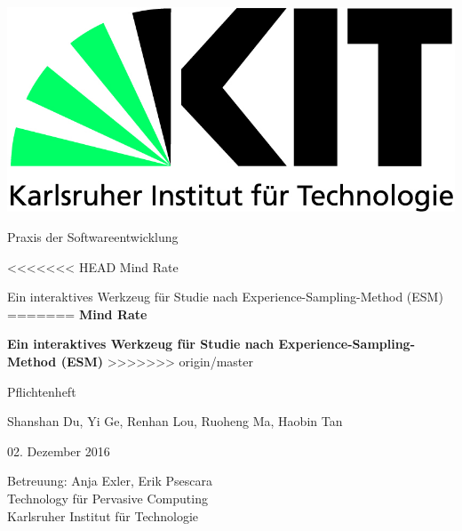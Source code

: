 \documentclass[a4paper]{scrreprt}
\begin{document}
 
    \begin{flushright}
        \includegraphics[scale = 0.7]{kit-logo.jpg}\\[0.5cm]
    \end{flushright}
    \vspace*{2cm} 

    \begin{center} \large 
    
        Praxis der Softwareentwicklung
        \vspace * {1.5cm}

<<<<<<< HEAD
        {\textbf \huge Mind Rate}
		
        \vspace*{1cm}
		
        {\textbf \large Ein interaktives Werkzeug f\"ur Studie nach Experience-Sampling-Method (ESM)}
=======
        \textbf{\huge Mind Rate}
		
        \vspace*{1cm}
		
        \textbf{\large Ein interaktives Werkzeug f\"ur Studie nach Experience-Sampling-Method (ESM)}
>>>>>>> origin/master
        \vspace*{1cm}

        {\large Pflichtenheft}
        \vspace*{2cm}

        Shanshan Du, Yi Ge, Renhan Lou, Ruoheng Ma, Haobin Tan
        \vspace*{1cm}

        02. Dezember 2016
        \vspace*{2.5cm}


        Betreuung: Anja Exler, Erik Psescara\\[1cm]
        Technology f\"ur Pervasive Computing\\[0.5cm]
        Karlsruher Institut für Technologie
    \end{center}
 
\end{document}
